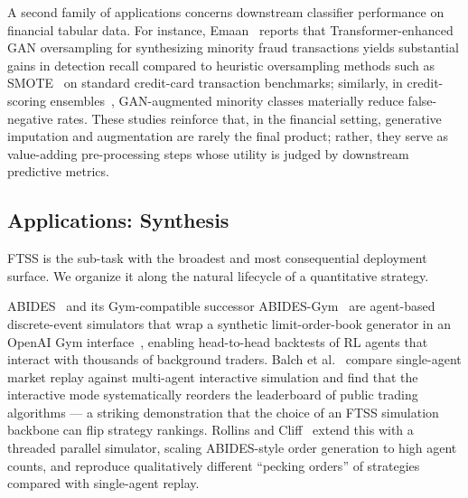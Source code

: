 A second family of applications concerns downstream classifier
performance on financial tabular data. For instance, Emaan~\citep{emaan2025improving} reports
that Transformer-enhanced GAN oversampling for synthesizing minority fraud transactions yields substantial gains
in detection recall compared to heuristic oversampling methods such as
SMOTE~\citep{chawla2002smote} on standard credit-card transaction benchmarks;
similarly, in credit-scoring ensembles~\citep{liu2021classification},
GAN-augmented minority classes materially reduce false-negative rates.
These studies reinforce that, in the financial setting, generative
imputation and augmentation are rarely the final product; rather, they
serve as value-adding pre-processing steps whose utility is judged by
downstream predictive metrics.

\subsection{Applications: Synthesis}

FTSS is the sub-task with the broadest and most consequential deployment
surface. We organize it along the natural lifecycle of a quantitative
strategy.

ABIDES~\citep{byrd2019abides} and its Gym-compatible successor
ABIDES-Gym~\citep{amrouni2021abides} are agent-based discrete-event
simulators that wrap a synthetic limit-order-book generator in an
OpenAI Gym interface~\citep{brockman2016openai}, enabling head-to-head backtests of RL agents that
interact with thousands of background traders.
Balch et al.~\citep{balch2019how} compare single-agent market replay against
multi-agent interactive simulation and find that the interactive mode
systematically reorders the leaderboard of public trading algorithms
--- a striking demonstration that the choice of an FTSS simulation backbone can flip
strategy rankings. Rollins and Cliff~\citep{rollins2020which} extend this with a threaded
parallel simulator, scaling ABIDES-style order generation to high agent
counts, and reproduce qualitatively different ``pecking orders'' of
strategies compared with single-agent replay.

